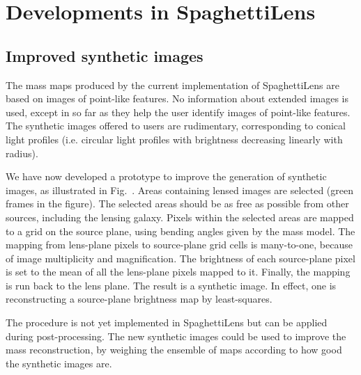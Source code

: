 
\section{Developments in SpaghettiLens}

\subsection{Improved synthetic images}\label{subsec:sourcefit}

The mass maps produced by the current implementation of SpaghettiLens
are based on images of point-like features.  No information about
extended images is used, except in so far as they help the user
identify images of point-like features.  The synthetic images offered
to users are rudimentary, corresponding to conical light profiles
(i.e.  circular light profiles with brightness decreasing linearly
with radius).

We have now developed a prototype to improve the generation of
synthetic images, as illustrated in Fig.~. Areas
containing lensed images are selected (green frames in the figure).
The selected areas should be as free as possible from other
sources, including the lensing galaxy. Pixels within the
selected areas are mapped to a grid on the source plane, using bending
angles given by the mass model.  The mapping from lens-plane pixels to
source-plane grid cells is many-to-one, because of image multiplicity
and magnification.  The brightness of each source-plane pixel is set
to the mean of all the lens-plane pixels mapped to it.  Finally, the
mapping is run back to the lens plane.  The result is a synthetic
image.  In effect, one is reconstructing a source-plane brightness map
by least-squares.

The procedure is not yet implemented in SpaghettiLens but can be
applied during post-processing.  The new synthetic images could be used to
improve the mass reconstruction, by weighing the ensemble of maps
according to how good the synthetic images are.

